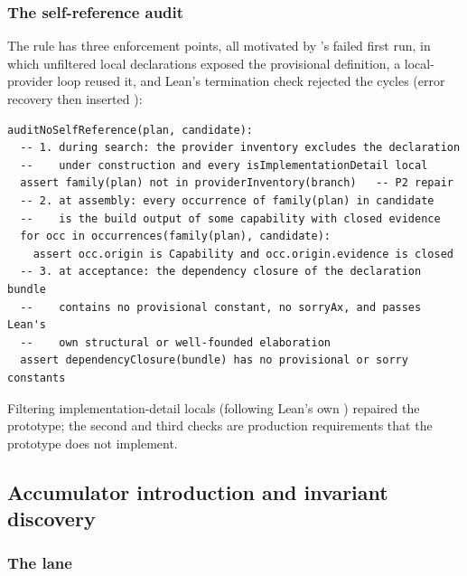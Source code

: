 \subsubsection{The self-reference audit}

The rule has three enforcement points, all motivated by 's failed first run, in which unfiltered local declarations exposed the provisional definition, a local-provider loop reused it, and Lean's termination check rejected the cycles (error recovery then inserted ):
\begin{lstlisting}
auditNoSelfReference(plan, candidate):
  -- 1. during search: the provider inventory excludes the declaration
  --    under construction and every isImplementationDetail local
  assert family(plan) not in providerInventory(branch)   -- P2 repair
  -- 2. at assembly: every occurrence of family(plan) in candidate
  --    is the build output of some capability with closed evidence
  for occ in occurrences(family(plan), candidate):
    assert occ.origin is Capability and occ.origin.evidence is closed
  -- 3. at acceptance: the dependency closure of the declaration bundle
  --    contains no provisional constant, no sorryAx, and passes Lean's
  --    own structural or well-founded elaboration
  assert dependencyClosure(bundle) has no provisional or sorry constants
\end{lstlisting}
Filtering implementation-detail locals (following Lean's own ) repaired the prototype; the second and third checks are production requirements that the prototype does not implement.

\subsection{Accumulator introduction and invariant discovery}\label{alg:rec-acc}

\subsubsection{The lane}

